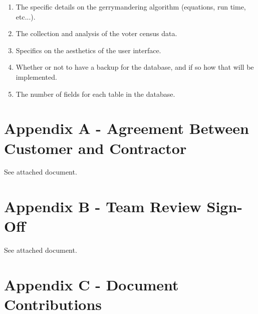 \documentclass{article}
\begin{document}
\vspace{2.5mm}

\begin{addmargin}[2em]{0em}

\begin{enumerate}

\item The specific details on the gerrymandering algorithm (equations, run time, etc...).
\item The collection and analysis of the voter census data.
\item Specifics on the aesthetics of the user interface.
\item Whether or not to have a backup for the database, and if so how that will be implemented.
\item The number of fields for each table in the database.

\end{enumerate}
\end{addmargin}


\section{Appendix A - Agreement Between Customer and Contractor}\label{sec:apendixA}

\vspace{2.5mm}

\begin{addmargin}[2em]{0em}

See attached document.

\end{addmargin}

\section{Appendix B - Team Review Sign-Off}\label{sec:appendixB}

\vspace{2.5mm}

\begin{addmargin}[2em]{0em}

See attached document.

\end{addmargin}

\section{Appendix C - Document Contributions}\label{sec:appendixC}
\end{document}
